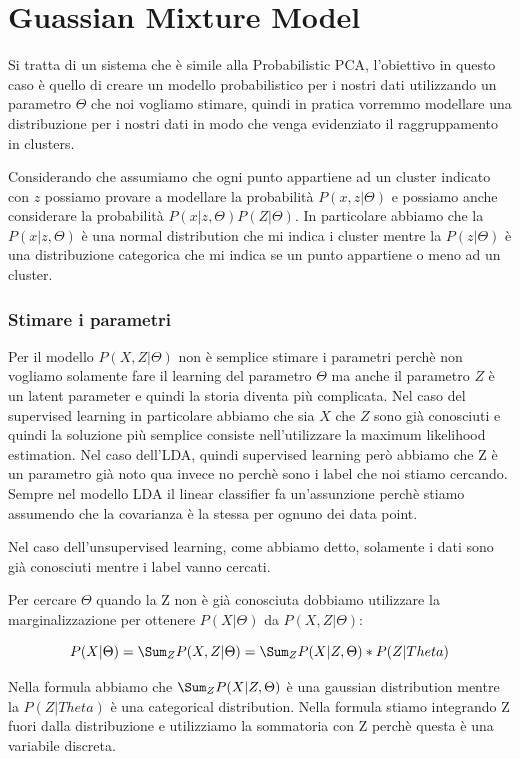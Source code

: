 \documentclass[14pt]{extreport}
\begin{document}
\section{Guassian Mixture Model}

Si tratta di un sistema che è simile alla Probabilistic PCA, l'obiettivo in questo caso è quello di creare un modello probabilistico per i nostri dati 
utilizzando un parametro $\Theta$ che noi vogliamo stimare, quindi in pratica vorremmo modellare una distribuzione per i nostri dati in modo che venga 
evidenziato il raggruppamento in clusters.

Considerando che assumiamo che ogni punto appartiene ad un cluster indicato con $z$ possiamo provare a modellare la probabilità $P(x,z | \Theta)$ e possiamo anche considerare
la probabilità $P(x|z,\Theta)P(Z|\Theta)$.
In particolare abbiamo che la $P(x|z,\Theta)$ è una normal distribution che mi indica i cluster mentre la $P(z|\Theta)$ è una distribuzione categorica 
che mi indica se un punto appartiene o meno ad un cluster.

\subsubsection{Stimare i parametri}

Per il modello $P(X, Z | \Theta)$ non è semplice stimare i parametri perchè non vogliamo solamente fare il learning del parametro $\Theta$ ma anche il parametro 
$Z$ è un latent parameter e quindi la storia diventa più complicata.
Nel caso del supervised learning in particolare abbiamo che sia $X$ che $Z$ sono già conosciuti e quindi la soluzione più semplice consiste nell'utilizzare la 
maximum likelihood estimation. Nel caso dell'LDA, quindi supervised learning però abbiamo che Z è un parametro già noto qua invece no perchè sono i label che noi stiamo cercando.
Sempre nel modello LDA il linear classifier fa un'assunzione perchè stiamo assumendo che la covarianza è la stessa per ognuno dei data point.

Nel caso dell'unsupervised learning, come abbiamo detto, solamente i dati sono già conosciuti mentre i label vanno cercati.

Per cercare $\Theta$ quando la Z non è già conosciuta dobbiamo utilizzare la marginalizzazione per ottenere $P(X|\Theta)$ da $P(X,Z|\Theta)$:

$$P(X|\Theta) = \Sum_Z P(X,Z|\Theta) = \Sum_Z P(X|Z, \Theta)*P(Z|Theta)$$

Nella formula abbiamo che $\Sum_Z P(X|Z, \Theta)$ è una gaussian distribution mentre la $P(Z|Theta)$ è una categorical distribution.
Nella formula stiamo integrando Z fuori dalla distribuzione e utilizziamo la sommatoria con Z perchè questa è una variabile discreta.
\end{document}
